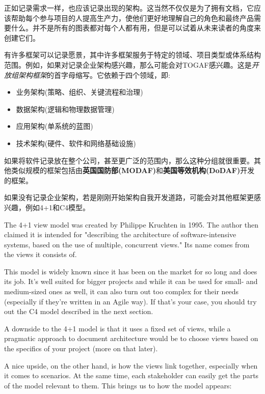 
正如记录需求一样，也应该记录出现的架构。这当然不仅仅是为了拥有文档，它应该帮助每个参与项目的人提高生产力，使他们更好地理解自己的角色和最终产品需要什么。并不是所有的图表都对每个人都有用，但是可以试着从未来读者的角度来创建它们。

有许多框架可以记录愿景，其中许多框架服务于特定的领域、项目类型或体系结构范围。例如，如果对记录企业架构感兴趣，那么可能会对TOGAF感兴趣。这是\textit{开放组架构框架}的首字母缩写。它依赖于四个领域，即:

\begin{itemize}
\item 
业务架构(策略、组织、关键流程和治理)

\item 
数据架构(逻辑和物理数据管理)

\item 
应用架构(单系统的蓝图)

\item
技术架构(硬件、软件和网络基础设施)
\end{itemize}

如果将软件记录放在整个公司，甚至更广泛的范围内，那么这种分组就很重要。其他类似规模的框架包括由\textbf{英国国防部(MODAF)}和\textbf{美国等效机构(DoDAF)}开发的框架。

如果没有记录企业架构，若是刚刚开始架构自我开发道路，可能会对其他框架更感兴趣，例如4+1和C4模型。


The 4+1 view model was created by Philippe Kruchten in 1995. The author then claimed it is intended for "describing the architecture of software-intensive systems, based on the use of multiple, concurrent views." Its name comes from the views it consists of.

This model is widely known since it has been on the market for so long and does its job. It's well suited for bigger projects and while it can be used for small- and medium-sized ones as well, it can also turn out too complex for their needs (especially if they're written in an Agile way). If that's your case, you should try out the C4 model described in the next section.

A downside to the 4+1 model is that it uses a fixed set of views, while a pragmatic approach to document architecture would be to choose views based on the specifics of your project (more on that later).

A nice upside, on the other hand, is how the views link together, especially when it comes to scenarios. At the same time, each stakeholder can easily get the parts of the model relevant to them. This brings us to how the model appears: 

